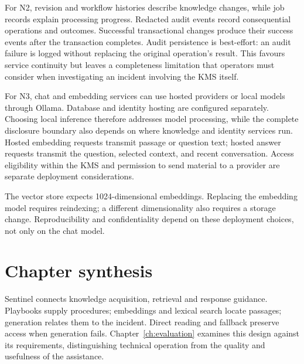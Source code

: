 For N2, revision and workflow histories describe knowledge changes, while job records explain processing progress. Redacted audit events record consequential operations and outcomes. Successful transactional changes produce their success events after the transaction completes. Audit persistence is best-effort: an audit failure is logged without replacing the original operation's result. This favours service continuity but leaves a completeness limitation that operators must consider when investigating an incident involving the KMS itself.

For N3, chat and embedding services can use hosted providers or local models through Ollama. Database and identity hosting are configured separately. Choosing local inference therefore addresses model processing, while the complete disclosure boundary also depends on where knowledge and identity services run. Hosted embedding requests transmit passage or question text; hosted answer requests transmit the question, selected context, and recent conversation. Access eligibility within the KMS and permission to send material to a provider are separate deployment considerations.

The vector store expects 1024-dimensional embeddings. Replacing the embedding model requires reindexing; a different dimensionality also requires a storage change. Reproducibility and confidentiality depend on these deployment choices, not only on the chat model.

\section{Chapter synthesis}

Sentinel connects knowledge acquisition, retrieval and response guidance. Playbooks supply procedures; embeddings and lexical search locate passages; generation relates them to the incident. Direct reading and fallback preserve access when generation fails. Chapter~\ref{ch:evaluation} examines this design against its requirements, distinguishing technical operation from the quality and usefulness of the assistance.
